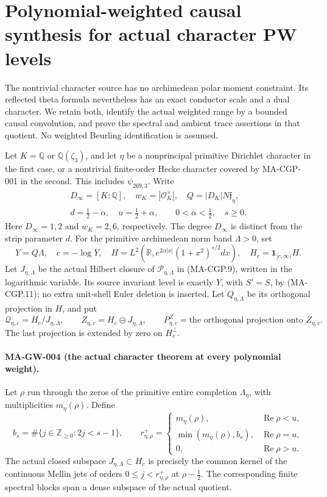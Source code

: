 \section{Polynomial-weighted causal synthesis for actual character PW levels}
\label{sec:character-weighted-pw}

The nontrivial character source has no archimedean polar moment
constraint.  Its reflected theta formula nevertheless has an exact
conductor scale and a dual character.  We retain both, identify the
actual weighted range by a bounded causal convolution, and prove
the spectral and ambient trace assertions in that quotient.
No weighted Beurling identification is assumed.

Let \(K=\mathbb Q\) or \(\mathbb Q(\zeta_3)\), and let \(\eta\)
be a nonprincipal primitive Dirichlet character in the first case,
or a nontrivial finite-order Hecke character covered by
MA-CGP-001 in the second.  This includes \(\psi_{269,3}\).
Write
\[
 \begin{gathered}
 D_\infty=[K:\mathbb Q],\quad
 w_K=|\mathcal O_K^\times|,\quad Q=|D_K|N\mathfrak f_\eta,\\
 d=\tfrac12-\alpha,\quad u=\tfrac12+\alpha,
 \qquad 0<\alpha<\tfrac12,\quad s\ge0 .
 \end{gathered}
 \tag{MA-GW.45}
\]
Here \(D_\infty=1,2\) and \(w_K=2,6\), respectively.
The degree \(D_\infty\) is distinct from the strip parameter \(d\).
For the primitive archimedean norm band \(\Lambda>0\), set
\[
 Y=Q\Lambda,\quad c=-\log Y,\quad
 H=L^2(\mathbb R,e^{2\alpha|x|}(1+x^2)^{s/2}dx),\quad
 H_c=\mathbf1_{[c,\infty)}H .
 \tag{MA-GW.46}
\]
Let \(J_{\eta,\Lambda}\) be the actual Hilbert closure of
\(\mathscr P_{\eta,\Lambda}\) in (MA-CGP.9), written in the
logarithmic variable.  Its source invariant level is exactly
\(Y\), with \(S'=S\), by (MA-CGP.11); no extra unit-shell
Euler deletion is inserted.  Let \(Q_{\eta,\Lambda}\) be its
orthogonal projection in \(H\), and put
\[
 \mathcal Q_{\eta,c}=H_c/J_{\eta,\Lambda},\qquad
 Z_{\eta,c}=H_c\ominus J_{\eta,\Lambda},\qquad
 P_{\eta,c}^Z=\text{the orthogonal projection onto }Z_{\eta,c}.
 \tag{MA-GW.47}
\]
The last projection is extended by zero on \(H_c^\perp\).

\paragraph{MA-GW-004 (the actual character theorem at every polynomial weight).}
Let \(\rho\) run through the zeros of the primitive entire
completion \(\Lambda_\eta\), with multiplicities \(m_\eta(\rho)\).
Define
\[
 b_s=\#\{j\in\mathbb Z_{\ge0}:2j<s-1\},\qquad
 r^+_{\eta,\rho}=
 \begin{cases}
 m_\eta(\rho),&\operatorname{Re}\rho<u,\\
 \min(m_\eta(\rho),b_s),&\operatorname{Re}\rho=u,\\
 0,&\operatorname{Re}\rho>u .
 \end{cases}
 \tag{MA-GW.48}
\]
The actual closed subspace \(J_{\eta,\Lambda}\subset H_c\)
is precisely the common kernel of the continuous Mellin jets
of orders \(0\le j<r^+_{\eta,\rho}\) at \(\rho-\tfrac12\).
The corresponding finite spectral blocks span a dense subspace
of the actual quotient.

